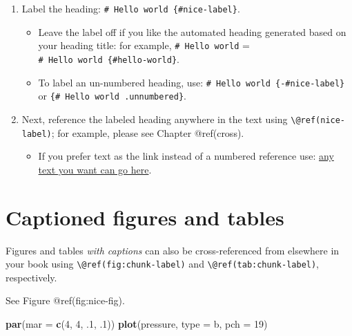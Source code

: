 \documentclass[
]{book}
\newenvironment{Shaded}{\begin{snugshade}}{\end{snugshade}}
\newcommand{\AttributeTok}[1]{\textcolor[rgb]{0.13,0.29,0.53}{#1}}
\newcommand{\DecValTok}[1]{\textcolor[rgb]{0.00,0.00,0.81}{#1}}
\newcommand{\FunctionTok}[1]{\textcolor[rgb]{0.13,0.29,0.53}{\textbf{#1}}}
\newcommand{\NormalTok}[1]{#1}
\newcommand{\StringTok}[1]{\textcolor[rgb]{0.31,0.60,0.02}{#1}}
\providecommand{\tightlist}{%
  \setlength{\itemsep}{0pt}\setlength{\parskip}{0pt}}
\begin{document}
\begin{enumerate}
\def\labelenumi{\arabic{enumi}.}
\tightlist
\item
  Label the heading: \texttt{\#\ Hello\ world\ \{\#nice-label\}}.

  \begin{itemize}
  \tightlist
  \item
    Leave the label off if you like the automated heading generated
    based on your heading title: for example, \texttt{\#\ Hello\ world}
    = \texttt{\#\ Hello\ world\ \{\#hello-world\}}.
  \item
    To label an un-numbered heading, use:
    \texttt{\#\ Hello\ world\ \{-\#nice-label\}} or
    \texttt{\{\#\ Hello\ world\ .unnumbered\}}.
  \end{itemize}
\item
  Next, reference the labeled heading anywhere in the text using
  \texttt{\textbackslash{}@ref(nice-label)}; for example, please see
  Chapter @ref(cross).

  \begin{itemize}
  \tightlist
  \item
    If you prefer text as the link instead of a numbered reference use:
    \protect\hyperlink{cross}{any text you want can go here}.
  \end{itemize}
\end{enumerate}

\hypertarget{captioned-figures-and-tables}{%
\section{Captioned figures and
tables}\label{captioned-figures-and-tables}}

Figures and tables \emph{with captions} can also be cross-referenced
from elsewhere in your book using
\texttt{\textbackslash{}@ref(fig:chunk-label)} and
\texttt{\textbackslash{}@ref(tab:chunk-label)}, respectively.

See Figure @ref(fig:nice-fig).

\begin{Shaded}
\begin{Highlighting}[]
\FunctionTok{par}\NormalTok{(}\AttributeTok{mar =} \FunctionTok{c}\NormalTok{(}\DecValTok{4}\NormalTok{, }\DecValTok{4}\NormalTok{, .}\DecValTok{1}\NormalTok{, .}\DecValTok{1}\NormalTok{))}
\FunctionTok{plot}\NormalTok{(pressure, }\AttributeTok{type =} \StringTok{\textquotesingle{}b\textquotesingle{}}\NormalTok{, }\AttributeTok{pch =} \DecValTok{19}\NormalTok{)}
\end{Highlighting}
\end{Shaded}
\end{document}
